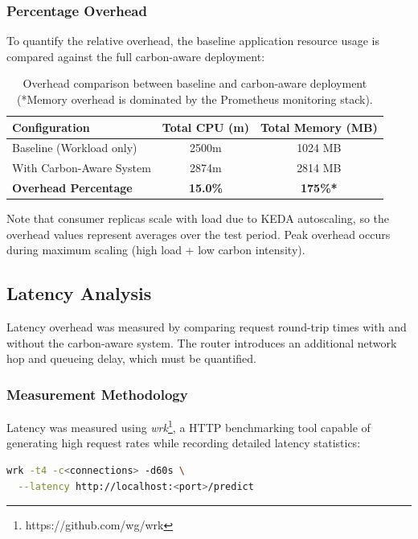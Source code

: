 \subsubsection{Percentage Overhead}

To quantify the relative overhead, the baseline application resource usage is compared against the full carbon-aware deployment:

\begin{table}[h]
\centering
\begin{tabular}{|l|c|c|}
\hline
\rowcolor{lightgray}
\textbf{Configuration} & \textbf{Total CPU (m)} & \textbf{Total Memory (MB)} \\
\hline
Baseline (Workload only) & 2500m & 1024 MB \\
\hline
With Carbon-Aware System & 2874m & 2814 MB \\
\hline
\rowcolor{lightgray}
\textbf{Overhead Percentage} & \textbf{15.0\%} & \textbf{175\%*} \\
\hline
\end{tabular}
\caption{Overhead comparison between baseline and carbon-aware deployment (*Memory overhead is dominated by the Prometheus monitoring stack).}
\label{table:overhead-percentage}
\end{table}

Note that consumer replicas scale with load due to KEDA autoscaling, so the overhead values represent averages over the test period. Peak overhead occurs during maximum scaling (high load + low carbon intensity).


\subsection{Latency Analysis}

Latency overhead was measured by comparing request round-trip times with and without the carbon-aware system. The router introduces an additional network hop and queueing delay, which must be quantified.

\subsubsection{Measurement Methodology}

Latency was measured using \textit{wrk}\footnote{https://github.com/wg/wrk}, a HTTP benchmarking tool capable of generating high request rates while recording detailed latency statistics:

\begin{lstlisting}[language=bash,caption={Latency benchmarking with wrk.},label=lst:wrk-bench]
wrk -t4 -c<connections> -d60s \
  --latency http://localhost:<port>/predict
\end{lstlisting}


